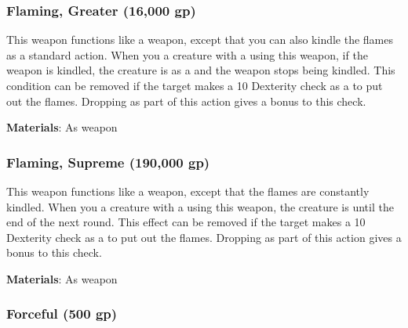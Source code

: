 \lowercase{\hypertarget{item:Flaming, Greater}{}}\label{item:Flaming, Greater}
\hypertarget{item:Flaming, Greater}{\subsubsection{Flaming, Greater\hfill{} (16,000 gp)}}

This weapon functions like a  weapon, except that you can also kindle the flames as a standard action.
When you  a creature with a  using this weapon, if the weapon is kindled,
the creature is  as a  and the weapon stops being kindled.
This condition can be removed if the target makes a  10 Dexterity check as a  to put out the flames.
Dropping  as part of this action gives a  bonus to this check.



\vspace{0.25em}
\textbf{Materials}: As weapon


\lowercase{\hypertarget{item:Flaming, Supreme}{}}\label{item:Flaming, Supreme}
\hypertarget{item:Flaming, Supreme}{\subsubsection{Flaming, Supreme\hfill{} (190,000 gp)}}

This weapon functions like a  weapon, except that the flames are constantly kindled.
When you  a creature with a  using this weapon,
the creature is  until the end of the next round.
This effect can be removed if the target makes a  10 Dexterity check as a  to put out the flames.
Dropping  as part of this action gives a  bonus to this check.



\vspace{0.25em}
\textbf{Materials}: As weapon


\lowercase{\hypertarget{item:Forceful}{}}\label{item:Forceful}
\hypertarget{item:Forceful}{\subsubsection{Forceful\hfill{} (500 gp)}}

